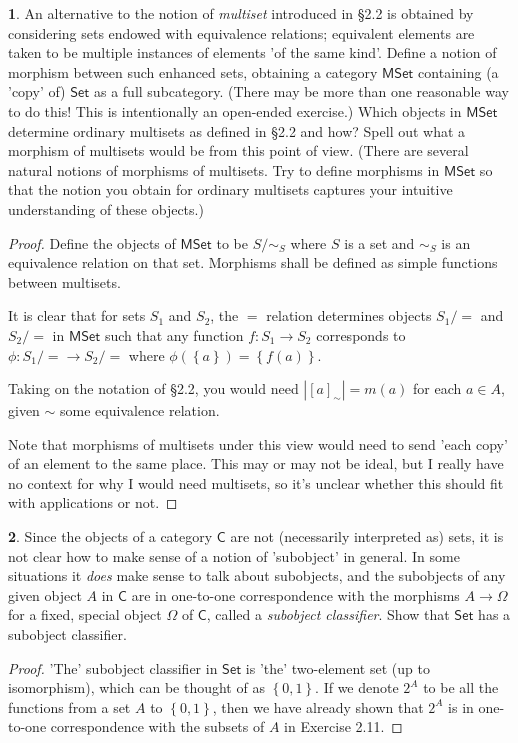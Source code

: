 \documentclass{article}
\newcounter{section-number}
\theoremstyle{definition}
\newtheorem{ex}{}[section-number]
\begin{document}
\begin{ex}
	An alternative to the notion of \textit{multiset} introduced in \S 2.2 is obtained by considering sets endowed with equivalence relations; equivalent elements are taken to be multiple instances of elements 'of the same kind'.
	Define a notion of morphism between such enhanced sets, obtaining a category $\mathsf{MSet}$ containing (a 'copy' of) $\mathsf{Set}$ as a full subcategory.
	(There may be more than one reasonable way to do this! This is intentionally an open-ended exercise.)
	Which objects in $\mathsf{MSet}$ determine ordinary multisets as defined in \S 2.2 and how?
	Spell out what a morphism of multisets would be from this point of view.
	(There are several natural notions of morphisms of multisets. Try to define morphisms in $\mathsf{MSet}$ so that the notion you obtain for ordinary multisets captures your intuitive understanding of these objects.)
\end{ex}
\begin{proof}
	Define the objects of $\mathsf{MSet}$ to be $S/{\sim_S}$ where $S$ is a set and $\sim_S$ is an equivalence relation on that set.
	Morphisms shall be defined as simple functions between multisets.

	It is clear that for sets $S_1$ and $S_2$, the $=$ relation determines objects $S_1/{=}$ and $S_2/{=}$ in $\mathsf{MSet}$ such that any function $f: S_1 \to S_2$ corresponds to $\phi: S_1/{=} \to S_2/{=}$ where $\phi(\left\lbrace a \right\rbrace) = \left\lbrace f(a) \right\rbrace$.

	Taking on the notation of \S 2.2, you would need $|[a]_\sim| = m(a)$ for each $a \in A$, given $\sim$ some equivalence relation.

	Note that morphisms of multisets under this view would need to send 'each copy' of an element to the same place.
	This may or may not be ideal, but I really have no context for why I would need multisets, so it's unclear whether this should fit with applications or not.
\end{proof}

\begin{ex}
	Since the objects of a category $\mathsf{C}$ are not (necessarily interpreted as) sets, it is not clear how to make sense of a notion of 'subobject' in general.
	In some situations it \textit{does} make sense to talk about subobjects, and the subobjects of any given object $A$ in $\mathsf{C}$ are in one-to-one correspondence with the morphisms $A \to \Omega$ for a fixed, special object $\Omega$ of $\mathsf{C}$, called a \textit{subobject classifier}.
	Show that $\mathsf{Set}$ has a subobject classifier.
\end{ex}
\begin{proof}
	'The' subobject classifier in $\mathsf{Set}$ is 'the' two-element set (up to isomorphism), which can be thought of as $\left\lbrace 0, 1 \right\rbrace$.
	If we denote $2^A$ to be all the functions from a set $A$ to $\left\lbrace 0, 1 \right\rbrace$, then we have already shown that $2^A$ is in one-to-one correspondence with the subsets of $A$ in Exercise 2.11.
\end{proof}
\end{document}
